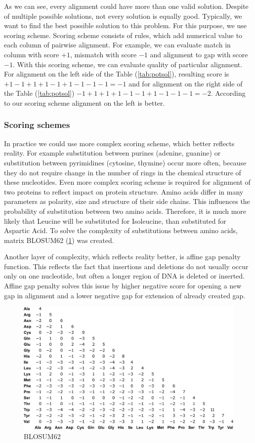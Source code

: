 As we can see, every alignment could have more than one valid solution.
Despite of multiple possible solutions, not every solution is equally good.
Typically, we want to find the best possible solution to this problem.
For this purpose, we use scoring scheme.
Scoring scheme consists of rules, which add numerical value to each column of pairwise alignment.
For example, we can evaluate match in column with score $+1$, mismatch with score $-1$ and alignment to gap with score $-1$.
With this scoring scheme, we can evaluate quality of particular alignment.
For alignment on the left side of the Table (\ref{tab:potsol}), resulting score is $+1-1+1+1-1+1-1-1-1 = -1$ and for alignment on the right side of the Table (\ref{tab:potsol}) $-1+1+1+1-1-1+1-1-1-1 = -2$.
According to our scoring scheme alignment on the left is better.

\subsubsection{Scoring schemes}
In practice we could use more complex scoring scheme, which better reflects reality.
For example substitution between purines (adenine, guanine) or substitution between pyrimidines (cytosine, thymine) occur more often, because they do not require change in the number of rings in the chemical structure of these nucleotides.
Even more complex scoring scheme is required for alignment of two proteins to reflect impact on protein structure.
Amino acids differ in many parameters as polarity, size and structure of their side chains.
This influences the probability of substitution between two amino acids.
Therefore, it is much more likely that Leucine will be substituted for Isoleucine, than substituted for Aspartic Acid.
To solve the complexity of substitutions between amino acids, matrix BLOSUM62 (\ref{fig:blosum}) was created.

Another layer of complexity, which reflects reality better, is affine gap penalty function.
This reflects the fact that insertions and deletions do not usually occur only on one nucleotide, but often a longer region of DNA is deleted or inserted.
Affine gap penalty solves this issue by higher negative score for opening a new gap in alignment and a lower negative gap for extension of already created gap.

\begin{figure}[ht]
 \centering
   \includegraphics[width=\textwidth]{./images/blosum62.png}
 \caption{BLOSUM62}
 \label{fig:blosum}
\end{figure}

